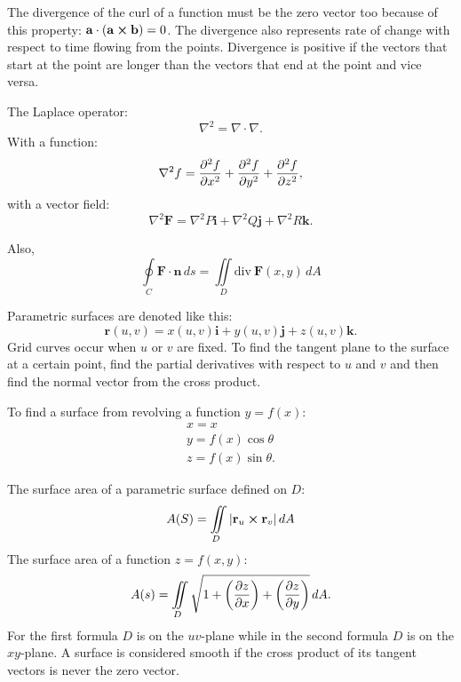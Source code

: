 \documentclass{article}
\begin{document}
The divergence of the curl of a function must be the zero vector too because of this property:
$\mathbf{a \cdot (a \cross b)} = 0$. The divergence also represents rate of change 
with respect to time flowing from the points. Divergence is positive if the vectors that
start at the point are longer than the vectors that end at the point and vice versa. 

The Laplace operator: 
\[
\nabla^2 = \nabla \cdot \nabla.
\]
With a function:
\[
\nabla^2 f = \pdv[2]{f}{x} + \pdv[2]{f}{y} + \pdv[2]{f}{z},
\]
with a vector field: 
\[
\nabla^2 \mathbf{F} = \nabla^2 P \mathbf{i} + \nabla^2 Q \mathbf{j} + \nabla^2 R \mathbf{k}.
\]

Also,
\[
\oint \limits_C \mathbf{F \cdot n} \, ds = \iint \limits_D \mbox{div} \ \mathbf{F}(x,y) \, dA
\]

Parametric surfaces are denoted like this:
\[
\mathbf{r}(u,v) = x(u,v)\mathbf{i} + y(u,v)\mathbf{j} + z(u,v)\mathbf{k}.
\]
Grid curves occur when $u$ or $v$ are fixed. To find the tangent plane to the surface at a certain point, find the partial
derivatives with respect to $u$ and $v$ and then find the normal vector from the cross product. 

To find a surface from revolving a function $y=f(x)$:
\begin{gather}
x=x \nonumber \\
y=f(x)\cos\theta \nonumber \\
z = f(x)\sin\theta \nonumber.
\end{gather}

The surface area of a parametric surface defined on $D$:
\[
A(S) = \iint \limits_D |\mathbf{r}_u \cross \mathbf{r}_v| \, dA 
\]
The surface area of a function $z=f(x,y)$:
\[
A(s)= \iint \limits_D \sqrt{1 + \left( \pdv{z}{x} \right) + \left( \pdv{z}{y} \right)} \, dA.
\]
For the first formula $D$ is on the $uv$-plane while in the second formula 
$D$ is on the $xy$-plane. A surface is considered smooth if 
the cross product of its tangent vectors is never the zero vector.
\end{document}
